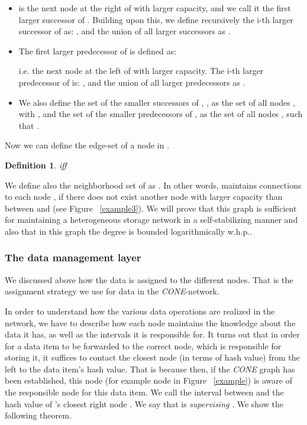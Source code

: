 \documentclass[11pt]{article}
\newtheorem{definition}[theorem]{Definition}
\begin{document}
 \begin{itemize}\itemsep0.1pt
\item 
is the next node at the right of  with larger capacity, and we call it the first larger successor of .
Building upon this, we define recursively the i-th larger successor of  as:
, and the union of all larger successors as
 .

\item The first larger predecessor of  is defined as:
 
i.e. the next node at the left of  with larger capacity. The i-th larger predecessor of  is:
 , and the union of all larger predecessors as
 .

\item We also define the set of the smaller successors of , , as the set of all nodes , with , and the set of the smaller predecessors of ,  as the set of all nodes , such that .

\end{itemize}

Now we can define the edge-set of a node in .
 
\begin{definition}
 iff 
\end{definition}

We define also the neighborhood set of  as .
In other words,  maintains connections to each node , if there does not exist another node with larger capacity than  between  and  (see Figure ~\ref{example3}).
We will prove that this graph is sufficient for maintaining a heterogeneous storage network in a self-stabilizing manner and also that in this graph the degree is bounded logarithmically w.h.p..

\subsubsection{The data management layer}

We discussed above how the data is assigned to the different nodes. That is the assignment strategy we use for data in the \emph{CONE}-network.

In order to understand how the various data operations are realized in the network, we have to describe how each node maintains the knowledge about the data it
has, as well as the intervals it is responsible for.
It turns out that in order for a data item to be forwarded to the correct node, which is responsible for storing it, it suffices to contact the closest node (in terms of hash value) from the left to the data item's hash value.
That is because then, if the \emph{CONE} graph has been established, this node (for example node  in  Figure ~\ref{example}) is aware of the responsible node for this data item. We call the interval between  and the hash value of 's closest right node . We say that  is \emph{supervising} .
We show the following theorem.
\end{document}
